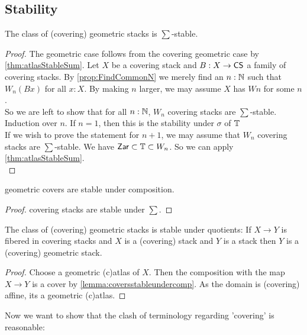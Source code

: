 \subsection{Stability}
\begin{theorem}{\label{thm:CSSum}}
	The class of (covering) geometric stacks is $\sum$-stable.
\end{theorem}
\begin{proof}
	The geometric case follows from the covering geometric case by \ref{thm:atlasStableSum}.
	Let $X$ be a covering stack and $B : X \to \mathsf{CS}$ a family of covering stacks.
	By \ref{prop:FindCommonN} we merely find an $n : \mathbb{N}$ such that $W_n (B x)$ for all $x : X$. By making $n$ larger, we may assume $X$ has $W n$ for some $n$. \\
	So we are left to show that for all $n : \mathbb{N}$, $W_n$ covering stacks are $\sum$-stable. \\
	
	
	Induction over $n$. If $n = 1$, then this is the stability under $\sigma$ of $\mathbb{T}$ \\
	If we wish to prove the statement for $n+1$, we may assume that $W_n$ covering stacks are $\sum$-stable. We have $\mathsf{Zar} \subset \mathbb{T} \subset W_n$. So we can apply \ref{thm:atlasStableSum}. \\

\end{proof}
\begin{lemma}{\label{lemma:coversstableundercomp}}
	geometric covers are stable under composition.
\end{lemma}
\begin{proof}
	covering stacks are stable under $\sum$.
\end{proof}


\begin{prop}{\label{prop:stackQuot}}
	The class of (covering) geometric stacks is stable under quotients: If $X \to Y$ is fibered in covering stacks and $X$ is a (covering) stack and $Y$ is a stack then $Y$ is a (covering) geometric stack.
\end{prop}
\begin{proof}
	Choose a geometric (c)atlas of $X$. Then the composition with the map $X \to Y$ is a cover by \ref{lemma:coversstableundercomp}. As the domain is (covering) affine, its a geometric (c)atlas.
\end{proof}
Now we want to show that the clash of terminology regarding 'covering' is reasonable:


